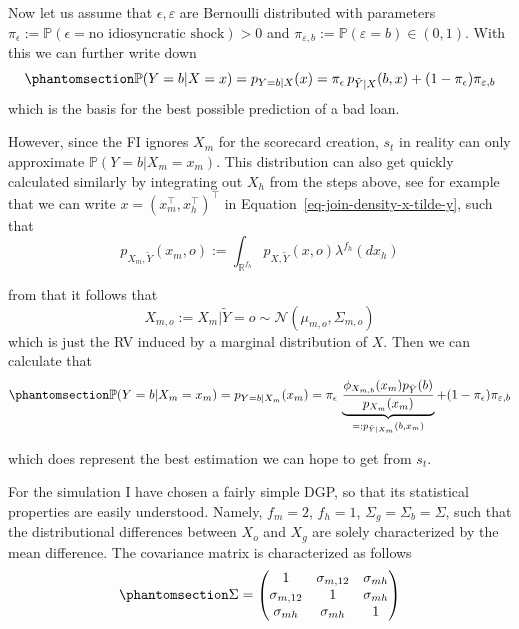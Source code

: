 \documentclass[
  12pt,
]{article}
\begin{document}
Now let us assume that \(\epsilon, \varepsilon\) are Bernoulli
distributed with parameters
\(\pi_{\epsilon} := \mathbb{P}(\epsilon =\text{no idiosyncratic shock}) > 0\)
and \(\pi_{\varepsilon, b} := \mathbb{P}(\varepsilon = b) \in (0,1)\).
With this we can further write down
\begin{equation}\protect\phantomsection\label{eq-pd-with-shock-perf-bayes}{
\mathbb{P}(Y = b | X = x) = p_{Y=b | X}(x) = 
    \pi_{\epsilon} \, p_{\tilde{Y} | X} (b, x) +
    (1 - \pi_{\epsilon}) \pi_{\varepsilon, b}
}\end{equation} which is the basis for the best possible prediction of a
bad loan.

However, since the FI ignores \(X_m\) for the scorecard creation,
\(s_t\) in reality can only approximate
\(\mathbb{P}(Y = b | X_m = x_m)\). This distribution can also get
quickly calculated similarly by integrating out \(X_h\) from the steps
above, see for example that we can write
\(x = \left(x_m^\top, x_h^\top \right)^\top\) in
Equation~\ref{eq-join-density-x-tilde-y}, such that \[
p_{X_m, \tilde{Y}} (x_m, o) :=  \int_{\mathbb{R}^{f_h}} p_{X, \tilde{Y}}(x, o) \lambda^{f_h}(d x_h)
\]

from that it follows that \[
X_{m,o} := X_m | \tilde{Y} = o \sim \mathcal{N} \left(\mu_{m, o}, \Sigma_{m, o} \right)
\] which is just the RV induced by a marginal distribution of \(X\).
Then we can calculate that
\begin{equation}\protect\phantomsection\label{eq-pd-with-shock-perf-bayes-reduced-model}{
\mathbb{P}(Y = b | X_m = x_m) = p_{Y=b | X_m}(x_m) = 
    \pi_{\epsilon} \,
    \underbrace{\frac{\phi_{X_{m, b}}(x_m) p_{\tilde{Y}}(b)}{p_{X_m}(x_m)}}_{
        =: p_{\tilde{Y} | X_m} (b, x_m)
    }
    +
    (1 - \pi_{\epsilon}) \pi_{\varepsilon, b}
}\end{equation}

which does represent the best estimation we can hope to get from
\(s_t\).

For the simulation I have chosen a fairly simple DGP, so that its
statistical properties are easily understood. Namely, \(f_m = 2\),
\(f_h = 1\), \(\Sigma_g = \Sigma_b = \Sigma\), such that the
distributional differences between \(X_o\) and \(X_g\) are solely
characterized by the mean difference. The covariance matrix is
characterized as follows
\begin{equation}\protect\phantomsection\label{eq-general-form-Sigma}{
\Sigma = \begin{pmatrix}
1 & \sigma_{m, 12} & \sigma_{mh} \\
\sigma_{m, 12} & 1 & \sigma_{mh} \\
\sigma_{mh} & \sigma_{mh} & 1
\end{pmatrix}
}\end{equation}
\end{document}
